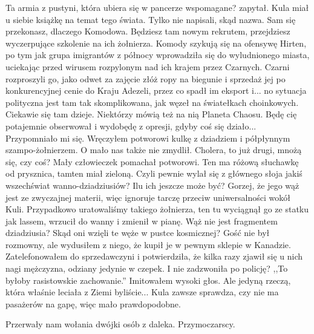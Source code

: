 \begin{dialogue}
\ds{} Ta armia z pustyni, która ubiera się w pancerze wspomagane? \dm{} zapytał. \dm{} Kula miał u siebie książkę na temat tego świata. Tylko nie napisali, skąd nazwa.
\ds{} Sam się przekonasz, dlaczego Komodowa. Będziesz tam nowym rekrutem, przejdziesz wyczerpujące szkolenie na ich żołnierza. 
Komody szykują się na ofensywę Hirten, po tym jak grupa imigrantów z północy wprowadziła się do wyludnionego miasta, uciekając przed wirusem rozpylonym nad ich krajem przez Czarnych.
Czarni rozproszyli go, jako odwet za zajęcie złóż ropy na biegunie i sprzedaż jej po konkurencyjnej cenie do Kraju Adezeli, przez co spadł im eksport i... 
no sytuacja polityczna jest tam tak skomplikowana, jak węzeł na światełkach choinkowych.
\ds{} Ciekawie się tam dzieje.
\ds{} Niektórzy mówią też na nią Planeta Chaosu. Będę cię potajemnie obserwował i wydobędę z opresji, gdyby coś się działo...
\ds{} Przypomniało mi się. \dm{} Wręczyłem potworowi kulkę z dziadziem i półpłynnym szampo-żołnierzem. \dm{} O mało nas także nie zmydlił.
\ds{} Cholera, to już drugi, mnożą się, czy coś? \dm{} Mały człowieczek pomachał potworowi. 
\ds{} Ten ma różową słuchawkę od prysznica, tamten miał zieloną. 
\ds{} Czyli pewnie wylał się z głównego słoja jakiś wszechświat wanno-dziadziusiów? Ilu ich jeszcze może być?
\ds{} Gorzej, że jego wąż jest ze zwyczajnej materii, więc ignoruje tarczę przeciw uniwersalności wokół Kuli.
Przypadkowo uratowaliśmy takiego żołnierza, ten tu wyciągnął go ze statku jak lassem, wrzucił do wanny i zmienił w pianę.
\ds{} Wąż nie jest fragmentem dziadziusia? Skąd oni wzięli te węże w pustce kosmicznej?
\ds{} Gość nie był rozmowny, ale wydusiłem z niego, że kupił je w pewnym sklepie w Kanadzie. 
Zatelefonowałem do sprzedawczyni i potwierdziła, że kilka razy zjawił się u nich nagi mężczyzna, odziany jedynie w czepek.
\ds{} I nie zadzwoniła po policję?
\ds{} ,,To byłoby rasistowskie zachowanie.'' \dm{} Imitowałem wysoki głos.
\ds{} Ale jedyną rzeczą, która właśnie leciała z Ziemi byliście...
\ds{} Kula zawsze sprawdza, czy nie ma pasażerów na gapę, więc mało prawdopodobne.

\end{dialogue}
Przerwały nam wołania dwójki osób z daleka. Przymoczarscy. 
